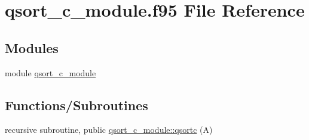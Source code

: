 \hypertarget{qsort__c__module_8f95}{}\section{qsort\+\_\+c\+\_\+module.\+f95 File Reference}
\label{qsort__c__module_8f95}
\subsection*{Modules}
\begin{DoxyCompactItemize}
\item 
module \hyperlink{namespaceqsort__c__module}{qsort\+\_\+c\+\_\+module}
\end{DoxyCompactItemize}
\subsection*{Functions/\+Subroutines}
\begin{DoxyCompactItemize}
\item 
recursive subroutine, public \hyperlink{namespaceqsort__c__module_a7e39c2068ea2fa39ea9aa0d7757ceb58}{qsort\+\_\+c\+\_\+module\+::qsortc} (A)
\end{DoxyCompactItemize}

